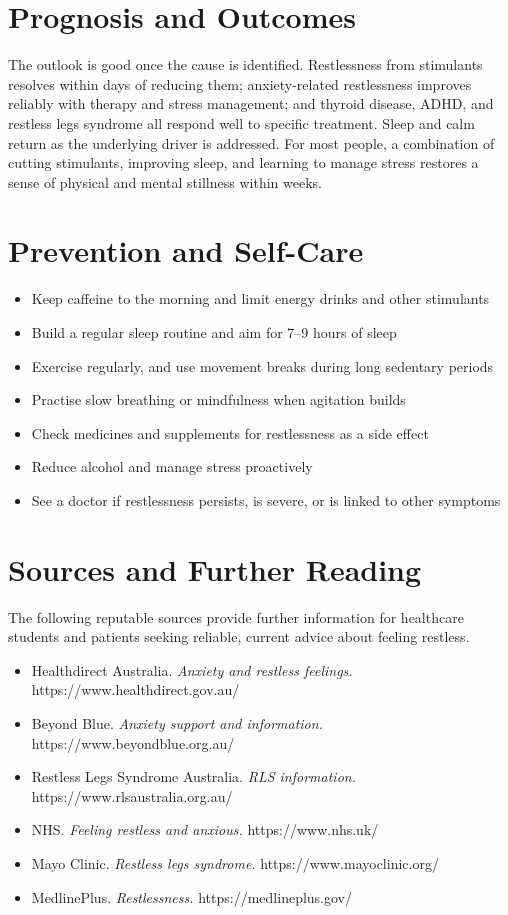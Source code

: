 \section*{Prognosis and Outcomes}
The outlook is good once the cause is identified. Restlessness from stimulants resolves within days of reducing them; anxiety-related restlessness improves reliably with therapy and stress management; and thyroid disease, ADHD, and restless legs syndrome all respond well to specific treatment. Sleep and calm return as the underlying driver is addressed. For most people, a combination of cutting stimulants, improving sleep, and learning to manage stress restores a sense of physical and mental stillness within weeks.

\section*{Prevention and Self-Care}
\begin{itemize}
    \item Keep caffeine to the morning and limit energy drinks and other stimulants
    \item Build a regular sleep routine and aim for 7--9 hours of sleep
    \item Exercise regularly, and use movement breaks during long sedentary periods
    \item Practise slow breathing or mindfulness when agitation builds
    \item Check medicines and supplements for restlessness as a side effect
    \item Reduce alcohol and manage stress proactively
    \item See a doctor if restlessness persists, is severe, or is linked to other symptoms
\end{itemize}

\section*{Sources and Further Reading}
The following reputable sources provide further information for healthcare students and patients seeking reliable, current advice about feeling restless.
\begin{itemize}
    \item Healthdirect Australia. \textit{Anxiety and restless feelings.} https://www.healthdirect.gov.au/
    \item Beyond Blue. \textit{Anxiety support and information.} https://www.beyondblue.org.au/
    \item Restless Legs Syndrome Australia. \textit{RLS information.} https://www.rlsaustralia.org.au/
    \item NHS. \textit{Feeling restless and anxious.} https://www.nhs.uk/
    \item Mayo Clinic. \textit{Restless legs syndrome.} https://www.mayoclinic.org/
    \item MedlinePlus. \textit{Restlessness.} https://medlineplus.gov/
\end{itemize}
